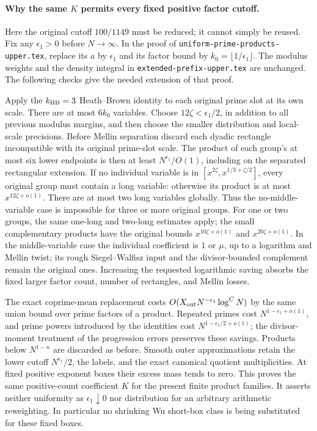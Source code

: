 \documentclass[11pt]{article}
\begin{document}
\paragraph{Why the same $K$ permits every fixed positive factor cutoff.}
Here the original cutoff $100/1149$ must be reduced; it cannot simply
be reused. Fix any $\epsilon_1>0$ before $N\to\infty$. In the proof of
\texttt{uniform-prime-products-upper.tex}, replace its $a$ by
$\epsilon_1$ and its factor bound by $k_0=\lfloor1/\epsilon_1\rfloor$.
The modulus weights and the density integral in
\texttt{extended-prefix-upper.tex} are unchanged. The following checks
give the needed extension of that proof.

Apply the $k_{\rm HB}=3$ Heath--Brown identity to each original prime
slot at its own scale. There are at most $6k_0$ variables. Choose
$12\zeta<\epsilon_1/2$, in addition to all previous modulus margins,
and then choose the smaller distribution and local-scale precisions.
Before Mellin separation discard each dyadic rectangle incompatible
with its original prime-slot scale. The product of each group's at
most six lower endpoints is then at least $N^{\epsilon_1}/O(1)$,
including on the separated rectangular extension. If no individual
variable is in $[x^{2\zeta},x^{1/3+\zeta/2}]$, every original group
must contain a long variable: otherwise its product is at most
$x^{12\zeta+o(1)}$. There are at most two long variables globally.
Thus the no-middle-variable case is impossible for three or more
original groups. For one or two groups, the same one-long and
two-long estimates apply; the small complementary products have
the original bounds $x^{10\zeta+o(1)}$ and $x^{20\zeta+o(1)}$.
In the middle-variable case the individual coefficient is $1$ or
$\mu$, up to a logarithm and Mellin twist; its rough Siegel--Walfisz
input and the divisor-bounded complement remain the original ones.
Increasing the requested logarithmic saving absorbs the fixed larger
factor count, number of rectangles, and Mellin losses.

The exact coprime-mean replacement costs
$O(X_{\rm out}N^{-\epsilon_1}\log^C N)$ by the same union bound over
prime factors of a product. Repeated primes cost
$N^{1-\epsilon_1+o(1)}$, and prime powers introduced by the identities
cost $N^{1-\epsilon_1/2+o(1)}$; the divisor-moment treatment of the
progression errors preserves these savings. Products below
$N^{1-\kappa}$ are discarded as before. Smooth outer approximations
retain the lower cutoff $N^{\epsilon_1}/2$, the labels, and the exact
canonical quotient multiplicities. At fixed positive exponent boxes
their excess mass tends to zero. This proves the same positive-count
coefficient $K$ for the present finite product families. It asserts
neither uniformity as $\epsilon_1\downarrow0$ nor distribution for an
arbitrary arithmetic reweighting. In particular no shrinking Wu
short-box class is being substituted for these fixed boxes.
\end{document}
